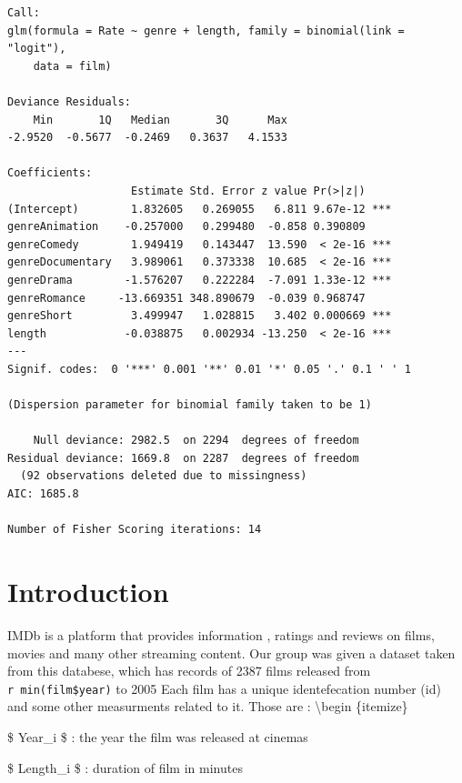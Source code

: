 \documentclass[
]{article}
\begin{document}
\begin{verbatim}
Call:
glm(formula = Rate ~ genre + length, family = binomial(link = "logit"), 
    data = film)

Deviance Residuals: 
    Min       1Q   Median       3Q      Max  
-2.9520  -0.5677  -0.2469   0.3637   4.1533  

Coefficients:
                   Estimate Std. Error z value Pr(>|z|)    
(Intercept)        1.832605   0.269055   6.811 9.67e-12 ***
genreAnimation    -0.257000   0.299480  -0.858 0.390809    
genreComedy        1.949419   0.143447  13.590  < 2e-16 ***
genreDocumentary   3.989061   0.373338  10.685  < 2e-16 ***
genreDrama        -1.576207   0.222284  -7.091 1.33e-12 ***
genreRomance     -13.669351 348.890679  -0.039 0.968747    
genreShort         3.499947   1.028815   3.402 0.000669 ***
length            -0.038875   0.002934 -13.250  < 2e-16 ***
---
Signif. codes:  0 '***' 0.001 '**' 0.01 '*' 0.05 '.' 0.1 ' ' 1

(Dispersion parameter for binomial family taken to be 1)

    Null deviance: 2982.5  on 2294  degrees of freedom
Residual deviance: 1669.8  on 2287  degrees of freedom
  (92 observations deleted due to missingness)
AIC: 1685.8

Number of Fisher Scoring iterations: 14
\end{verbatim}

\hypertarget{sec:Intro}{%
\section{Introduction}\label{sec:Intro}}

IMDb is a platform that provides information , ratings and reviews on
films, movies and many other streaming content. Our group was given a
dataset taken from this databese, which has records of 2387 films
released from \texttt{r\ min(film\$year)} to 2005 Each film has a unique
identefecation number (id) and some other measurments related to it.
Those are : \textbackslash begin \{itemize\}

\item

\$ Year\_i \$ : the year the film was released at cinemas

\item

\$ Length\_i \$ : duration of film in minutes

\item
\end{document}
